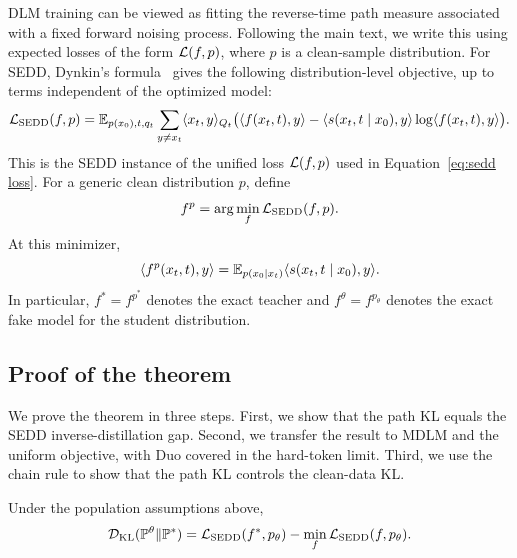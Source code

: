 DLM training can be viewed as fitting the reverse-time path measure associated
with a fixed forward noising process. Following the main text, we write this
using expected losses of the form \(\mathcal{L}(f,p)\), where \(p\) is a clean-sample
distribution. For SEDD, Dynkin's formula~\citep{hanson2007applied,
campbell2022continuous} gives the
following distribution-level objective, up to terms independent of the optimized
model:
\begin{equation}
\label{eq:sedd-distribution}
\begin{aligned}
    \mathcal{L}_{\mathrm{SEDD}}(f,p)
    =
    \mathbb{E}_{p(x_0),t,q_t}
    \sum_{y\neq x_t}
    \langle x_t,y\rangle_{Q_t}
    \bigl(
      \langle f(x_t,t),y\rangle
      -
      \langle s(x_t,t\mid x_0),y\rangle
      \log \langle f(x_t,t),y\rangle
    \bigr).
\end{aligned}
\end{equation}
This is the SEDD instance of the unified loss \(\mathcal{L}(f,p)\) used in
Equation~\eqref{eq:sedd loss}. For a generic clean distribution \(p\), define
\[
    f^p=\arg\min_f \mathcal{L}_{\mathrm{SEDD}}(f,p).
\]
At this minimizer,
\begin{equation}
\label{eq:posterior-score}
    \langle f^p(x_t,t),y\rangle
    =
    \mathbb{E}_{p(x_0\mid x_t)}
    \langle s(x_t,t\mid x_0),y\rangle .
\end{equation}
In particular, \(f^*=f^{p^*}\) denotes the exact teacher and
\(f^\theta=f^{p_\theta}\) denotes the exact fake model for the student
distribution.

\subsection{Proof of the theorem}
\label{app: proof of the theorem}

We prove the theorem in three steps. First, we show that the path KL equals the
SEDD inverse-distillation gap. Second, we transfer the result to MDLM and the
uniform objective, with Duo covered in the hard-token limit. Third, we use the
chain rule to show that the path KL controls the clean-data KL.

\begin{lemma}
\label{lem:sedd-path-kl-gap}
Under the population assumptions above,
\begin{equation}
\label{eq:sedd-path-kl-gap}
    \mathcal{D}_{\mathrm{KL}}(\mathbb{P}^\theta\|\mathbb{P}^*)
    =
    \mathcal{L}_{\mathrm{SEDD}}(f^*,p_\theta)
    -
    \min_f \mathcal{L}_{\mathrm{SEDD}}(f,p_\theta).
\end{equation}
\end{lemma}

